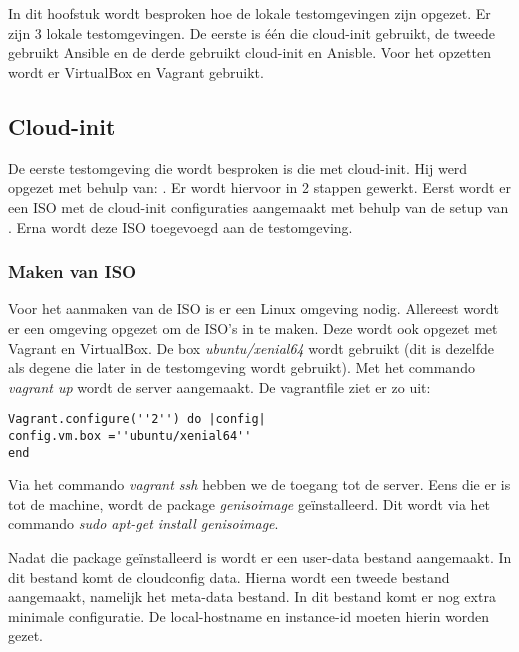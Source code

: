 \chapter{}
\label{ch:testlokaal}

In dit hoofstuk wordt besproken hoe de lokale testomgevingen zijn opgezet. Er zijn 3 lokale testomgevingen. De eerste is één die cloud-init gebruikt, de tweede gebruikt Ansible en de derde gebruikt cloud-init en Anisble. Voor het opzetten wordt er VirtualBox en Vagrant gebruikt.

\section{Cloud-init}
De eerste testomgeving die wordt besproken is die met cloud-init. Hij werd opgezet met behulp van: \autocite{cloudVagrant}. Er wordt hiervoor in 2 stappen gewerkt. Eerst wordt er een ISO met de cloud-init configuraties aangemaakt met behulp van de setup van \autocite{cloudVagrant}. Erna wordt deze ISO toegevoegd aan de testomgeving.

\subsection{Maken van ISO}
Voor het aanmaken van de ISO is er een Linux omgeving nodig. Allereest wordt er een omgeving opgezet om de ISO's in te maken. Deze wordt ook opgezet met Vagrant en VirtualBox. De box \textit{ubuntu/xenial64} wordt gebruikt (dit is dezelfde als degene die later in de testomgeving wordt gebruikt). Met het commando \textit{vagrant up} wordt de server aangemaakt. De vagrantfile ziet er zo uit:
\begin{lstlisting}
Vagrant.configure(''2'') do |config|
config.vm.box =''ubuntu/xenial64''
end
\end{lstlisting}

Via het commando \textit{vagrant ssh} hebben we de toegang tot de server. Eens die er is tot de machine, wordt de package \textit{genisoimage} geïnstalleerd. Dit wordt via het commando \textit{sudo apt-get install genisoimage}. 

Nadat die package geïnstalleerd is wordt er een user-data bestand aangemaakt. In dit bestand komt de cloudconfig data. Hierna wordt een tweede bestand aangemaakt, namelijk het meta-data bestand. In dit bestand komt er nog extra minimale configuratie. De local-hostname en instance-id moeten hierin worden gezet.

